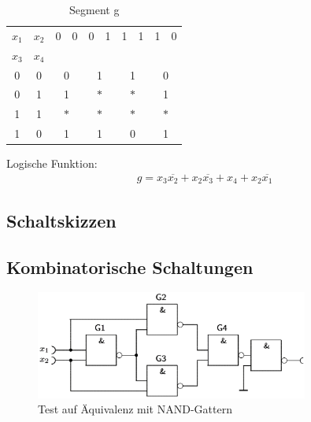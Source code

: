 \documentclass[numbers=noenddot,12pt,a4paper]{scrartcl}
\newcommand{\nicht}[1]{\overline{#1}}
\begin{document}
\begin{table}[H]
\centering
\begin{tabular}{cc||cc|cc|cc|cc}
$x_1$ & $x_2$ & 0 & 0 & 0 & 1 & 1 & 1 & 1 & 0 \\ \cline{0-1} 
$x_3$ & $x_4$ & & & & & & & & \\ \cline{1-10}
0 & 0 & \multicolumn{2}{|c|}{0} & \multicolumn{2}{|c|}{1} & \multicolumn{2}{|c|}{1} & \multicolumn{2}{|c}{0} \\
0 & 1 & \multicolumn{2}{|c|}{1} & \multicolumn{2}{|c|}{$\ast$} & \multicolumn{2}{|c|}{$\ast$} & \multicolumn{2}{|c}{1} \\ 
1 & 1 & \multicolumn{2}{|c|}{$\ast$} & \multicolumn{2}{|c|}{$\ast$} & \multicolumn{2}{|c|}{$\ast$} & \multicolumn{2}{|c}{$\ast$} \\ 
1 & 0 & \multicolumn{2}{|c|}{1} & \multicolumn{2}{|c|}{1} & \multicolumn{2}{|c|}{0} & \multicolumn{2}{|c}{1} \\ 
\end{tabular}
\caption{Segment g}
\end{table}
Logische Funktion:
\begin{align}
g=  x_3 \nicht{x_2}+ x_2 \nicht{x_3} + x_4 + x_2\nicht{x_1}
\end{align}

\subsection{Schaltskizzen}
\subsection{Kombinatorische Schaltungen}
\vspace{-0.5cm}
\begin{figure}[H]
\centering
\includegraphics[width=0.8\textwidth]{gleichheit.png}
\caption{Test auf Äquivalenz mit NAND-Gattern}
\end{figure}
\end{document}
